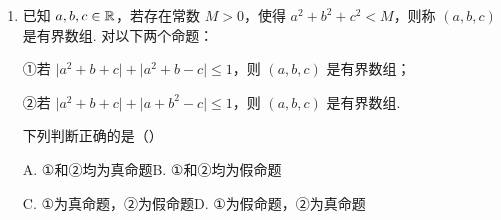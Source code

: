 \begin{enumerate}
\item 已知 $a,b,c\in\mathbb{R}$，若存在常数 $M>0$，使得 $a^2+b^2+c^2<M$，则称 $(a,b,c)$ 是有界数组. 对以下两个命题：

①若 $\lvert a^2+b+c\rvert+\lvert a^2+b-c\rvert\leqslant1$，则 $(a,b,c)$ 是有界数组；

②若 $\lvert a^2+b+c\rvert+\lvert a+b^2-c\rvert\leqslant1$，则 $(a,b,c)$ 是有界数组.%

下列判断正确的是\mbox{（\quad）}

\keepwithprev
A. ①和②均为真命题\qquad\qquad B. ①和②均为假命题

C. ①为真命题，②为假命题\qquad D. ①为假命题，②为真命题

\ifanswer
\solbegin
{}
\solend
\fi

\end{enumerate}


